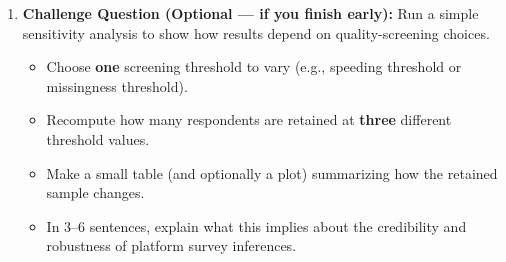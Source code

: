 \documentclass[11pt]{article}
\begin{document}
\begin{enumerate}
\item \textbf{Challenge Question (Optional --- if you finish early):}
Run a simple sensitivity analysis to show how results depend on quality-screening choices.
\begin{itemize}
  \item Choose \textbf{one} screening threshold to vary (e.g., speeding threshold or missingness threshold).
  \item Recompute how many respondents are retained at \textbf{three} different threshold values.
  \item Make a small table (and optionally a plot) summarizing how the retained sample changes.
  \item In 3--6 sentences, explain what this implies about the credibility and robustness of platform survey inferences.
\end{itemize}

\end{enumerate}
\end{document}
